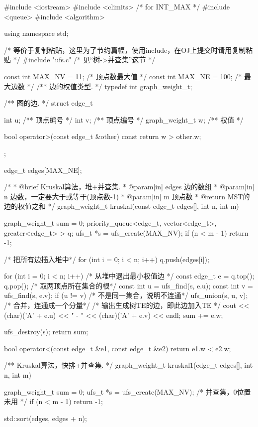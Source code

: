 \begin{Codex}[label=kruskal.cpp]
#include <iostream>
#include <climits>  /* for INT_MAX */
#include <queue>
#include <algorithm>

using namespace std;

/* 等价于复制粘贴，这里为了节约篇幅，使用include，在OJ上提交时请用复制粘贴 */
#include "ufs.c"  /* 见“树->并查集”这节 */

const int MAX_NV = 11; /* 顶点数最大值 */
const int MAX_NE = 100;  /* 最大边数 */
/** 边的权值类型. */
typedef int graph_weight_t;

/** 图的边. */
struct edge_t{
    int u;  /** 顶点编号 */
    int v;  /** 顶点编号 */
    graph_weight_t w;  /** 权值 */

    bool operator>(const edge_t &other) const {
        return w > other.w;
    }
};

edge_t edges[MAX_NE];


/*
  * @brief Kruskal算法，堆+并查集.
  * @param[in] edges 边的数组
  * @param[in] n 边数，一定要大于或等于(顶点数-1)
  * @param[in] m 顶点数
  * @return MST的边的权值之和
  */
graph_weight_t kruskal(const edge_t edges[], int n, int m) {
    graph_weight_t sum = 0;
    priority_queue<edge_t, vector<edge_t>,
                                greater<edge_t> > q;
    ufs_t *s = ufs_create(MAX_NV);
    if (n < m - 1) return -1;

    /* 把所有边插入堆中*/
    for (int i = 0; i < n; i++) {
        q.push(edges[i]);
    }

    for (int i = 0; i < n; i++) {
        /* 从堆中退出最小权值边 */
        const edge_t e = q.top(); q.pop();
        /* 取两顶点所在集合的根*/
        const int u = ufs_find(s, e.u);
        const int v = ufs_find(s, e.v);
        if (u != v) { /* 不是同一集合，说明不连通*/
            ufs_union(s, u, v); /* 合并，连通成一个分量*/
            /* 输出生成树TE的边，即此边加入TE */
            cout << (char)('A' + e.u) << " - " << (char)('A' + e.v) << endl;
            sum += e.w;
        }
    }

    ufs_destroy(s);
    return sum;
}

bool operator<(const edge_t &e1, const edge_t &e2) {
    return e1.w < e2.w;
}

/** Kruskal算法，快排+并查集. */
graph_weight_t kruskal1(edge_t edges[], int n, int m) {
    graph_weight_t sum = 0;
    ufs_t *s = ufs_create(MAX_NV);  /* 并查集，0位置未用  */
    if (n < m - 1) return -1;

    std::sort(edges, edges + n);

}
\end{Codex}
